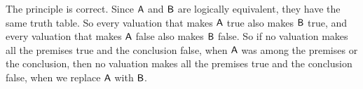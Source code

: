 \begin{earg}
\begin{ebullet}
\item[] The principle is correct. Since $\mathsf{A}$ and $\mathsf{B}$ are logically equivalent, they have the same truth table. So every valuation that makes $\mathsf{A}$ true also makes $\mathsf{B}$ true, and every valuation that makes $\mathsf{A}$ false also makes $\mathsf{B}$ false. So if no valuation makes all the premises true and the conclusion false, when $\mathsf{A}$ was among the premises or the conclusion, then no valuation makes all the premises true and the conclusion false, when we replace $\mathsf{A}$ with $\mathsf{B}$.
\end{ebullet}

\end{earg}

